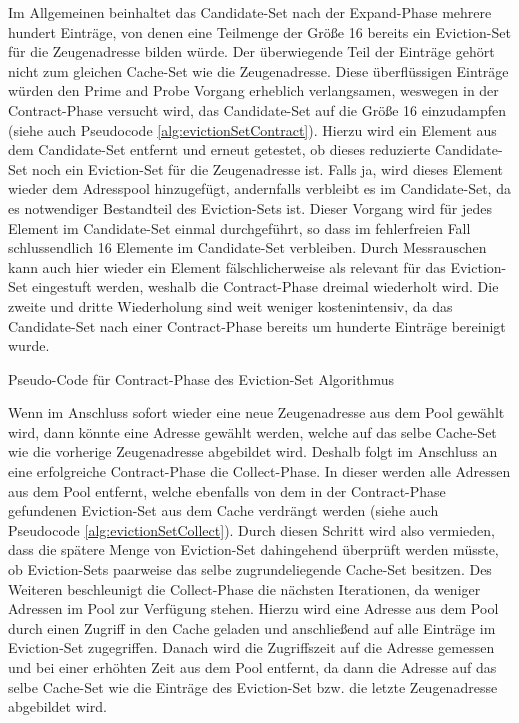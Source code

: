 Im Allgemeinen beinhaltet das Candidate-Set nach der Expand-Phase mehrere hundert Einträge, von denen eine Teilmenge der Größe 16 bereits ein Eviction-Set für die Zeugenadresse bilden würde. 
Der überwiegende Teil der Einträge gehört nicht zum gleichen Cache-Set wie die Zeugenadresse.
Diese überflüssigen Einträge würden den Prime and Probe Vorgang erheblich verlangsamen, weswegen in der Contract-Phase versucht wird, das Candidate-Set auf die Größe 16 einzudampfen (siehe auch Pseudocode \ref{alg:evictionSetContract}).
Hierzu wird ein Element aus dem Candidate-Set entfernt und erneut getestet, ob dieses reduzierte Candidate-Set noch ein Eviction-Set für die Zeugenadresse ist.
Falls ja, wird dieses Element wieder dem Adresspool hinzugefügt, andernfalls verbleibt es im Candidate-Set, da es  notwendiger Bestandteil des Eviction-Sets ist.
Dieser Vorgang wird für jedes Element im Candidate-Set einmal durchgeführt, so dass im fehlerfreien Fall schlussendlich 16 Elemente im Candidate-Set verbleiben.
Durch Messrauschen kann auch hier wieder ein Element fälschlicherweise als relevant für das Eviction-Set eingestuft werden, weshalb die Contract-Phase dreimal wiederholt wird.
Die zweite und dritte Wiederholung sind weit weniger kostenintensiv, da das Candidate-Set nach einer Contract-Phase bereits um hunderte Einträge bereinigt wurde.

\begin{algorithm}[h]
\DontPrintSemicolon
\caption{Pseudo-Code für Contract-Phase des Eviction-Set Algorithmus}
\label{alg:evictionSetContract}
\end{algorithm}

Wenn im Anschluss sofort wieder eine neue Zeugenadresse aus dem Pool gewählt wird, dann könnte eine Adresse gewählt werden, welche auf das selbe Cache-Set wie die vorherige Zeugenadresse abgebildet wird.
Deshalb folgt im Anschluss an eine erfolgreiche Contract-Phase die Collect-Phase.
In dieser werden alle Adressen aus dem Pool entfernt, welche ebenfalls von dem in der Contract-Phase gefundenen Eviction-Set aus dem Cache verdrängt werden (siehe auch Pseudocode \ref{alg:evictionSetCollect}).
Durch diesen Schritt wird also vermieden, dass die spätere Menge von Eviction-Set dahingehend überprüft werden müsste, ob Eviction-Sets paarweise das selbe zugrundeliegende Cache-Set besitzen. 
Des Weiteren beschleunigt die Collect-Phase die nächsten Iterationen, da weniger Adressen im Pool zur Verfügung stehen.
Hierzu wird eine Adresse aus dem Pool durch einen Zugriff in den Cache geladen und anschließend auf alle Einträge im Eviction-Set zugegriffen.
Danach wird die Zugriffszeit auf die Adresse gemessen und bei einer erhöhten Zeit aus dem Pool entfernt, da dann die Adresse auf das selbe Cache-Set wie die Einträge des Eviction-Set bzw. die letzte Zeugenadresse abgebildet wird.

